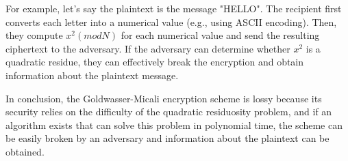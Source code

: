 For example, let's say the plaintext is the message "HELLO". The recipient first converts each letter into a numerical value 
(e.g., using ASCII encoding). Then, they compute $x^2 (mod N)$ for each numerical value and send the resulting ciphertext to the adversary. 
If the adversary can determine whether $x^2$ is a quadratic residue, they can effectively break the encryption and obtain information about 
the plaintext message.

In conclusion, the Goldwasser-Micali encryption scheme is lossy because its security relies on the difficulty of the quadratic residuosity 
problem, and if an algorithm exists that can solve this problem in polynomial time, the scheme can be easily broken by an adversary and 
information about  the plaintext can be obtained.
